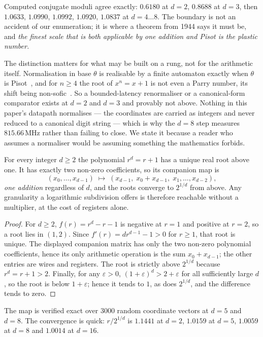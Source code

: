 Computed conjugate moduli agree exactly: $0.6180$ at $d=2$, $0.8688$ at $d=3$,
then $1.0633$, $1.0990$, $1.0992$, $1.0920$, $1.0837$ at $d=4\ldots8$. The
boundary is not an accident of our enumeration; it is where a theorem from 1944
says it must be, and \emph{the finest scale that is both applicable by one
addition and Pisot is the plastic number.}

The distinction matters for what may be built on a rung, not for the arithmetic
itself. Normalisation in base $\theta$ is realisable by a finite automaton
exactly when $\theta$ is Pisot~\cite{berend1994}, and for $n\ge4$ the root of
$x^n = x+1$ is not even a Parry number, its shift being
non-sofic~\cite{akiyama2016}. So a bounded-latency renormaliser or a
canonical-form comparator exists at $d=2$ and $d=3$ and provably not above.
Nothing in this paper's datapath normalises --- the coordinates are carried as
integers and never reduced to a canonical digit string --- which is why the
$d=8$ step measures $815.66$\,MHz rather than failing to close. We state it
because a reader who assumes a normaliser would be assuming something the
mathematics forbids.

\begin{theorem}\label{thm:oneadder}
For every integer $d\geq2$ the polynomial $r^{d}=r+1$ has a unique real root above one. It
has exactly two non-zero coefficients, so its companion map is
\[
  (x_0,\dots,x_{d-1}) \;\mapsto\; (x_{d-1},\; x_0+x_{d-1},\; x_1,\dots,x_{d-2}),
\]
\emph{one addition} regardless of $d$, and the roots converge to $2^{1/d}$ from
above. Any granularity a logarithmic subdivision offers is therefore reachable
without a multiplier, at the cost of registers alone.
\end{theorem}
\begin{proof}
For $d\geq2$, $f(r)=r^d-r-1$ is negative at $r=1$ and positive at $r=2$,
so a root lies in $(1,2)$. Since $f'(r)=dr^{d-1}-1>0$ for $r\geq1$,
that root is unique. The displayed companion matrix has only the two
non-zero polynomial coefficients, hence its only arithmetic operation is the
sum $x_0+x_{d-1}$; the other entries are wires and registers. The root is
strictly above $2^{1/d}$ because $r^d=r+1>2$. Finally, for any
$\varepsilon>0$, $(1+\varepsilon)^d>2+\varepsilon$ for all sufficiently
large $d$, so the root is below $1+\varepsilon$; hence it tends to $1$,
as does $2^{1/d}$, and the difference tends to zero.
\end{proof}

The map is verified exact over $3000$ random coordinate vectors at $d=5$ and
$d=8$. The convergence is quick: $r/2^{1/d}$ is $1.1441$ at $d=2$, $1.0159$ at
$d=5$, $1.0059$ at $d=8$ and $1.0014$ at $d=16$.

